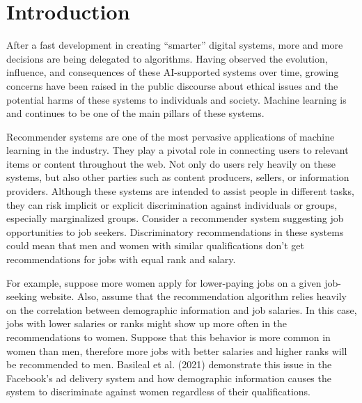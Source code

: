 \chapter{Introduction}
\label{ch:intro}




After a fast development in creating ``smarter'' digital systems, more and more decisions are being delegated to algorithms. Having observed the evolution, influence, and consequences of these AI-supported systems over time, growing concerns have been raised in the public discourse about ethical issues and the potential harms of these systems to individuals and society. Machine learning is and continues to be one of the main pillars of these systems.
 
Recommender systems are one of the most pervasive applications of machine learning in the industry. They play a pivotal role in connecting users to relevant items or content throughout the web. Not only do users rely heavily on these systems, but also other parties such as content producers, sellers, or information providers. Although these systems are intended to assist people in different tasks, they can risk implicit or explicit discrimination against individuals or groups, especially marginalized groups. Consider a recommender system suggesting job opportunities to job seekers. Discriminatory recommendations in these systems could mean that men and women with similar qualifications don't get recommendations for jobs with equal rank and salary.



For example, suppose more women apply for lower-paying jobs on a given job-seeking website. Also, assume that the recommendation algorithm relies heavily on the correlation between demographic information and job salaries. In this case, jobs with lower salaries or ranks might show up more often in the recommendations to women. Suppose that this behavior is more common in women than men, therefore more jobs with better salaries and higher ranks will be recommended to men. Basileal et al. (2021) \cite{Korolova2021JobAds} demonstrate this issue in the Facebook's ad delivery system and how demographic information causes the system to discriminate against women regardless of their qualifications.

